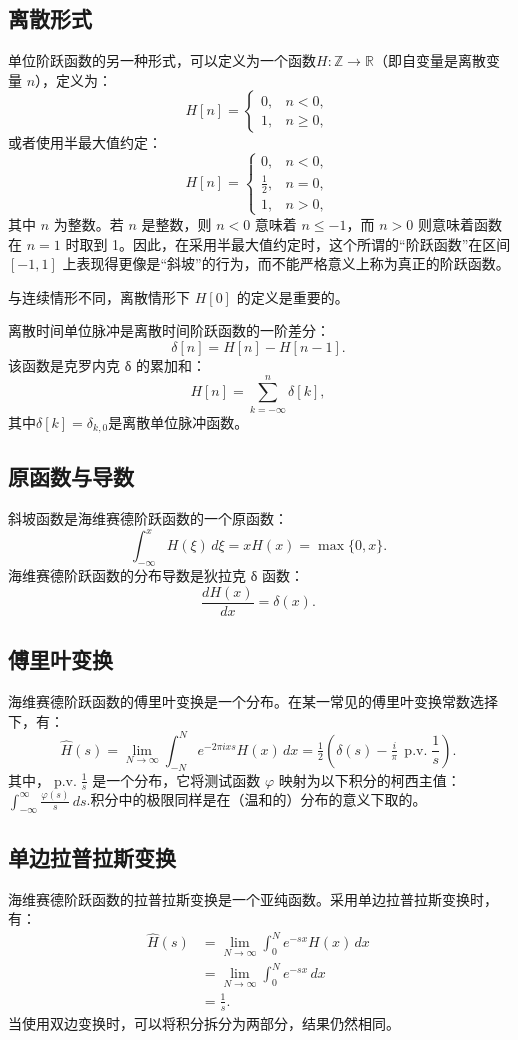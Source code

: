 \subsection{离散形式}
单位阶跃函数的另一种形式，可以定义为一个函数$H : \mathbb{Z} \to \mathbb{R}$（即自变量是离散变量 $n$），定义为：
$$
H[n] =
\begin{cases}
0, & n < 0, \\[6pt]
1, & n \geq 0,
\end{cases}~
$$
或者使用半最大值约定：
$$
H[n] =
\begin{cases}
0, & n < 0, \\[6pt]
\tfrac{1}{2}, & n = 0, \\[6pt]
1, & n > 0,
\end{cases}~
$$
其中 $n$ 为整数。若 $n$ 是整数，则 $n < 0$ 意味着 $n \leq -1$，而 $n > 0$ 则意味着函数在 $n = 1$ 时取到 1。因此，在采用半最大值约定时，这个所谓的“阶跃函数”在区间 $[-1,1]$ 上表现得更像是“斜坡”的行为，而不能严格意义上称为真正的阶跃函数。

与连续情形不同，离散情形下 $H[0]$ 的定义是重要的。

离散时间单位脉冲是离散时间阶跃函数的一阶差分：
$$
\delta[n] = H[n] - H[n-1].~
$$
该函数是克罗内克 δ 的累加和：
$$
H[n] = \sum_{k=-\infty}^{n} \delta[k],~
$$
其中$\delta[k] = \delta_{k,0}$是离散单位脉冲函数。
\subsection{原函数与导数}
斜坡函数是海维赛德阶跃函数的一个原函数：
$$
\int_{-\infty}^{x} H(\xi)\, d\xi = xH(x) = \max\{0, x\}.~
$$
海维赛德阶跃函数的分布导数是狄拉克 δ 函数：
$$
\frac{dH(x)}{dx} = \delta(x).~
$$
\subsection{傅里叶变换}
海维赛德阶跃函数的傅里叶变换是一个分布。在某一常见的傅里叶变换常数选择下，有：
$$
\hat{H}(s) = \lim_{N \to \infty} \int_{-N}^{N} e^{-2\pi i x s} H(x)\, dx 
= \tfrac{1}{2}\left( \delta(s) - \tfrac{i}{\pi}\,\operatorname{p.v.}\frac{1}{s} \right).~
$$
其中，$\operatorname{p.v.}\tfrac{1}{s}$ 是一个分布，它将测试函数 $\varphi$ 映射为以下积分的柯西主值：$\int_{-\infty}^{\infty} \frac{\varphi(s)}{s}\, ds$.积分中的极限同样是在（温和的）分布的意义下取的。
\subsection{单边拉普拉斯变换}
海维赛德阶跃函数的拉普拉斯变换是一个亚纯函数。采用单边拉普拉斯变换时，有：
$$
\begin{aligned}
\hat{H}(s) &= \lim_{N \to \infty} \int_{0}^{N} e^{-sx} H(x)\, dx \\[6pt]
&= \lim_{N \to \infty} \int_{0}^{N} e^{-sx}\, dx \\[6pt]
&= \frac{1}{s}.
\end{aligned}~
$$
当使用双边变换时，可以将积分拆分为两部分，结果仍然相同。
